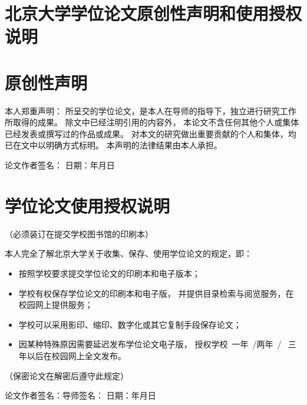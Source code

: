 \cleardoublepage
\section*{北京大学学位论文原创性声明和使用授权说明}
\vfill

\section*{原创性声明}

本人郑重声明：
所呈交的学位论文，是本人在导师的指导下，独立进行研究工作所取得的成果。
除文中已经注明引用的内容外，
本论文不含任何其他个人或集体已经发表或撰写过的作品或成果。
对本文的研究做出重要贡献的个人和集体，均已在文中以明确方式标明。
本声明的法律结果由本人承担。
\vspace{2.5em}\par

\rightline
{%
	论文作者签名：\hspace{5em}%
	日期：\hspace{2em}年\hspace{2em}月\hspace{2em}日%
}
\vfill

\section*{学位论文使用授权说明}
\vspace{-1em}\par
\centerline{（必须装订在提交学校图书馆的印刷本）}
\vspace{1em}\par

本人完全了解北京大学关于收集、保存、使用学位论文的规定，即：
\begin{itemize}\denselist
	\item 按照学校要求提交学位论文的印刷本和电子版本；
	\item 学校有权保存学位论文的印刷本和电子版，
		并提供目录检索与阅览服务，在校园网上提供服务；
	\item 学校可以采用影印、缩印、数字化或其它复制手段保存论文；
	\item 因某种特殊原因需要延迟发布学位论文电子版，
		授权学校~\Square\nobreakspace{}一年~/\Square\nobreakspace{}两年~/~%
		\Square\nobreakspace{}三年以后在校园网上全文发布。
\end{itemize}
\par（保密论文在解密后遵守此规定）
\vspace{2.5em}\par

\rightline
{%
	论文作者签名：\hspace{5em}导师签名：\hspace{5em}%
	日期：\hspace{2em}年\hspace{2em}月\hspace{2em}日%
}

